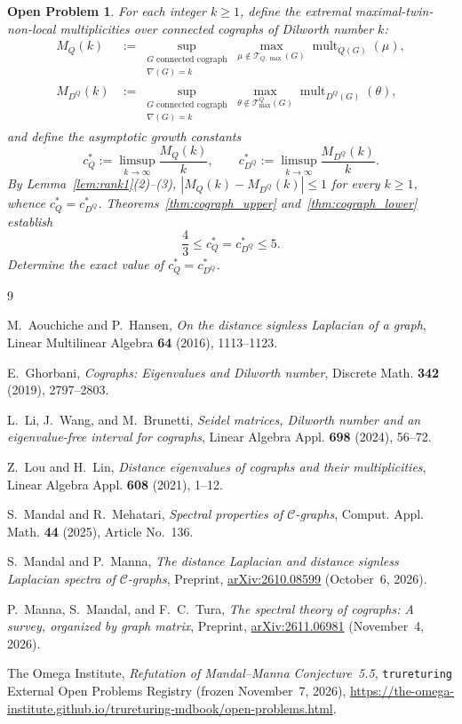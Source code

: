 \documentclass[11pt,a4paper]{article}
\newtheorem{problem}[theorem]{Open Problem}
\theoremstyle{definition}
\DeclareMathOperator{\mult}{mult}
\begin{document}
\begin{problem}\label{prob:cstar}
  For each integer $k \ge 1$, define the extremal maximal-twin-non-local multiplicities over connected cographs of Dilworth number $k$:
  \begin{align*}
    M_Q(k) &:= \sup_{\substack{G\text{ connected cograph} \\ \nabla(G) = k}} \max_{\mu \notin \mathcal{T}_{Q,\max}(G)} \mult_{Q(G)}(\mu), \\
    M_{D^Q}(k) &:= \sup_{\substack{G\text{ connected cograph} \\ \nabla(G) = k}} \max_{\theta \notin \mathcal{T}^Q_{\max}(G)} \mult_{D^Q(G)}(\theta),
  \end{align*}
  and define the asymptotic growth constants
  \[
    c_Q^* := \limsup_{k \to \infty} \frac{M_Q(k)}{k}, \qquad
    c_{D^Q}^* := \limsup_{k \to \infty} \frac{M_{D^Q}(k)}{k}.
  \]
  By Lemma~\ref{lem:rank1}(2)--(3), $|M_Q(k) - M_{D^Q}(k)| \le 1$ for every $k \ge 1$, whence $c_Q^* = c_{D^Q}^*$. Theorems~\ref{thm:cograph_upper} and~\ref{thm:cograph_lower} establish
  \[
    \frac{4}{3} \le c_Q^* = c_{D^Q}^* \le 5.
  \]
  Determine the exact value of $c_Q^* = c_{D^Q}^*$.
\end{problem}

\begin{thebibliography}{9}

M.~Aouchiche and P.~Hansen,
\emph{On the distance signless Laplacian of a graph},
Linear Multilinear Algebra \textbf{64} (2016), 1113--1123.

E.~Ghorbani,
\emph{Cographs: Eigenvalues and Dilworth number},
Discrete Math. \textbf{342} (2019), 2797--2803.

L.~Li, J.~Wang, and M.~Brunetti,
\emph{Seidel matrices, Dilworth number and an eigenvalue-free interval for cographs},
Linear Algebra Appl. \textbf{698} (2024), 56--72.

Z.~Lou and H.~Lin,
\emph{Distance eigenvalues of cographs and their multiplicities},
Linear Algebra Appl. \textbf{608} (2021), 1--12.

S.~Mandal and R.~Mehatari,
\emph{Spectral properties of $\mathcal{C}$-graphs},
Comput. Appl. Math. \textbf{44} (2025), Article No.~136.

S.~Mandal and P.~Manna,
\emph{The distance Laplacian and distance signless Laplacian spectra of $\mathcal{C}$-graphs},
Preprint, \href{https://arxiv.org/abs/2610.08599}{arXiv:2610.08599} (October~6, 2026).

P.~Manna, S.~Mandal, and F.~C.~Tura,
\emph{The spectral theory of cographs: A survey, organized by graph matrix},
Preprint, \href{https://arxiv.org/abs/2611.06981}{arXiv:2611.06981} (November~4, 2026).

The Omega Institute,
\emph{Refutation of Mandal--Manna Conjecture~5.5},
\texttt{trureturing} External Open Problems Registry (frozen November~7, 2026),
\href{https://the-omega-institute.github.io/trureturing-mdbook/open-problems.html}{https://the-omega-institute.github.io/trureturing-mdbook/open-problems.html}.

\end{thebibliography}
\end{document}
